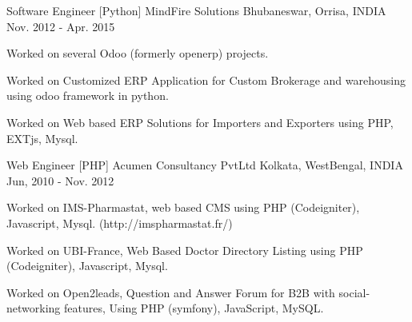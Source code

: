 \begin{cventries}
  \cventry
    {Software Engineer [Python]} %
    {MindFire Solutions} %
    {Bhubaneswar, Orrisa, INDIA} %
    {Nov. 2012 - Apr. 2015} %
    {
      \begin{cvitems} %
        \item {Worked on several Odoo (formerly openerp) projects.}
        \item {Worked on Customized ERP Application for Custom Brokerage and warehousing using odoo framework in python.}
        \item {Worked on Web based ERP Solutions for Importers and Exporters using PHP, EXTjs, Mysql.}
      \end{cvitems}
    }

  \cventry
    {Web Engineer  [PHP]} %
    {Acumen Consultancy PvtLtd} %
    {Kolkata, WestBengal,  INDIA} %
    {Jun, 2010 - Nov. 2012} %
    {
      \begin{cvitems} %
        \item {Worked on IMS-Pharmastat, web based CMS using PHP (Codeigniter), Javascript, Mysql. (http://imspharmastat.fr/)}
        \item {Worked on UBI-France, Web Based Doctor Directory Listing using PHP (Codeigniter), Javascript, Mysql.}
        \item {Worked on Open2leads, Question and Answer Forum for B2B with social-networking features, Using  PHP (symfony), JavaScript, MySQL.}
      \end{cvitems}
    }
\end{cventries}
